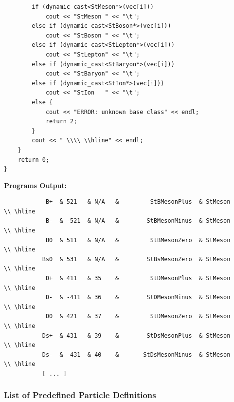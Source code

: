 \documentclass[twoside]{article}
\begin{document}
\begin{description}
{\begin{verbatim}
        if (dynamic_cast<StMeson*>(vec[i]))
            cout << "StMeson " << "\t";
        else if (dynamic_cast<StBoson*>(vec[i]))
            cout << "StBoson " << "\t";
        else if (dynamic_cast<StLepton*>(vec[i]))
            cout << "StLepton" << "\t";
        else if (dynamic_cast<StBaryon*>(vec[i]))
            cout << "StBaryon" << "\t";
        else if (dynamic_cast<StIon*>(vec[i]))
            cout << "StIon   " << "\t";
        else {
            cout << "ERROR: unknown base class" << endl;
            return 2;
        }
        cout << " \\\\ \\hline" << endl;
    }    
    return 0;
}
\end{verbatim}
{\bf Programs Output:}
\begin{verbatim}
            B+  & 521   & N/A   &         StBMesonPlus  & StMeson        \\ \hline
            B-  & -521  & N/A   &        StBMesonMinus  & StMeson        \\ \hline
            B0  & 511   & N/A   &         StBMesonZero  & StMeson        \\ \hline
           Bs0  & 531   & N/A   &        StBsMesonZero  & StMeson        \\ \hline
            D+  & 411   & 35    &         StDMesonPlus  & StMeson        \\ \hline
            D-  & -411  & 36    &        StDMesonMinus  & StMeson        \\ \hline
            D0  & 421   & 37    &         StDMesonZero  & StMeson        \\ \hline
           Ds+  & 431   & 39    &        StDsMesonPlus  & StMeson        \\ \hline
           Ds-  & -431  & 40    &       StDsMesonMinus  & StMeson        \\ \hline
           [ ... ]
\end{verbatim}
}

\subsubsection{List of Predefined Particle Definitions}
\label{sec:predefpart}


\end{description}
\end{document}

